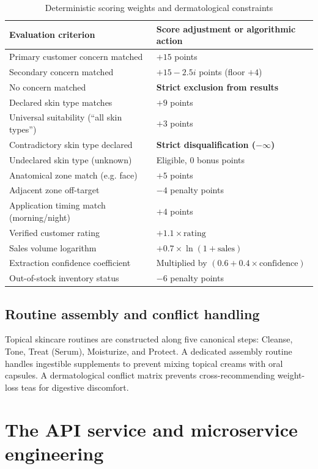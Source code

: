 \begin{table}[H]
\caption{Deterministic scoring weights and dermatological constraints}
\label{tab:scoring}
\centering
\begin{tabularx}{\textwidth}{L{5.4cm} X}
\toprule
\textbf{Evaluation criterion} & \textbf{Score adjustment or algorithmic action} \\
\midrule
Primary customer concern matched & $+15$ points \\
Secondary concern matched & $+15 - 2.5i$ points (floor $+4$) \\
No concern matched & \textbf{Strict exclusion from results} \\
Declared skin type matches & $+9$ points \\
Universal suitability (``all skin types'') & $+3$ points \\
Contradictory skin type declared & \textbf{Strict disqualification ($-\infty$)} \\
Undeclared skin type (unknown) & Eligible, 0 bonus points \\
Anatomical zone match (e.g. face) & $+5$ points \\
Adjacent zone off-target & $-4$ penalty points \\
Application timing match (morning/night) & $+4$ points \\
Verified customer rating & $+1.1 \times \text{rating}$ \\
Sales volume logarithm & $+0.7 \times \ln(1 + \text{sales})$ \\
Extraction confidence coefficient & Multiplied by $(0.6 + 0.4 \times \text{confidence})$ \\
Out-of-stock inventory status & $-6$ penalty points \\
\bottomrule
\end{tabularx}
\end{table}

\subsection{Routine assembly and conflict handling}

Topical skincare routines are constructed along five canonical steps: Cleanse, Tone, Treat (Serum), Moisturize, and Protect. A dedicated assembly routine handles ingestible supplements to prevent mixing topical creams with oral capsules. A dermatological conflict matrix prevents cross-recommending weight-loss teas for digestive discomfort.

\section{The API service and microservice engineering}

